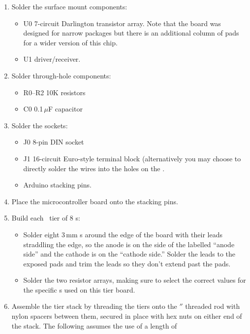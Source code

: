 \begin{enumerate}
	\item Solder the surface mount components:
		\begin{itemize}
			\item U0  7-circuit  Darlington transistor array.
				Note that the board was designed for narrow  packages but
				there is an additional column of pads for a wider version of this chip.
			\item U1   driver/receiver.
		\end{itemize}
	\item Solder through-hole components:
		\begin{itemize}
			\item R0--R2 10K resistors
			\item C0 0.1\,$\mu$F capacitor
		\end{itemize}
	\item Solder the sockets:
		\begin{itemize}
			\item J0 8-pin DIN socket
			\item J1 16-circuit Euro-style terminal block (alternatively you may choose to
				directly solder the  wires into the holes on the .
			\item Arduino stacking pins.
		\end{itemize}
	\item Place the microcontroller board onto the stacking pins.
	\item Build each \led\ tier of 8 \led s:
		\begin{itemize}
			\item Solder eight 3\,mm \led s around the edge of the board with their leads straddling
				the edge, so the anode is on the side of the  labelled ``anode side'' and the
				cathode is on the ``cathode side.'' Solder the leads to the exposed pads and trim the
				leads so they don't extend past the pads.
			\item Solder the two resistor arrays, making sure to select the correct values for the specific
				\led s used on this tier board.
		\end{itemize}
	\item Assemble the tier stack by threading the tiers onto the $''$ threaded rod with nylon spacers between them,
		secured in place with hex nuts on either end of the stack. The following assumes the use of a length of 

\end{enumerate}
